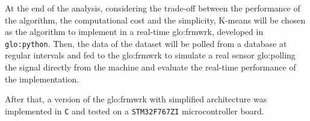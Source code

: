 At the end of the analysis, considering the trade-off between the performance of the algorithm, the computational cost and the simplicity, K-means will be chosen as the algorithm to implement in a real-time \gls{glo:frmwrk}, developed in \texttt{\gls{glo:python}}. Then, the data of the dataset will be polled from a database at regular intervals and fed to the \gls{glo:frmwrk} to simulate a real sensor \gls{glo:polling} the signal directly from the machine and evaluate the real-time performance of the implementation. 

After that, a version of the \gls{glo:frmwrk} with simplified architecture was implemented in \texttt{C} and tested on a \texttt{STM32F767ZI} microcontroller board.

